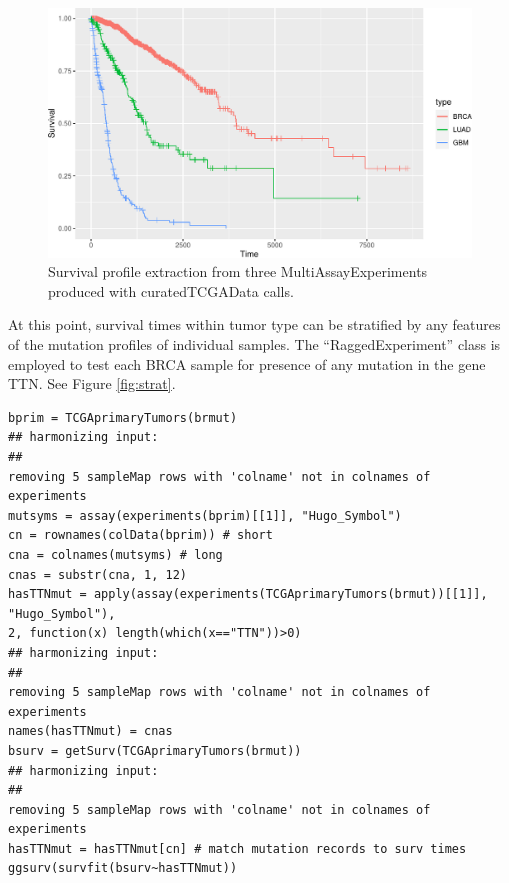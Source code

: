 \begin{figure}
\includegraphics[width=0.8\linewidth,]{bioccb_files/figure-latex/dothesurv-1} \caption{Survival profile extraction from three MultiAssayExperiments produced with curatedTCGAData calls.}\label{fig:dothesurv}
\end{figure}

At this point, survival times within tumor type can be stratified by any
features of the mutation profiles of individual samples.
The ``RaggedExperiment'' class is employed to test each BRCA sample for
presence of any mutation in the gene TTN. See Figure \ref{fig:strat}.

\begin{shaded}
\begin{verbatim}
bprim = TCGAprimaryTumors(brmut)
## harmonizing input:
##
removing 5 sampleMap rows with 'colname' not in colnames of experiments
mutsyms = assay(experiments(bprim)[[1]], "Hugo_Symbol")
cn = rownames(colData(bprim)) # short
cna = colnames(mutsyms) # long
cnas = substr(cna, 1, 12)
hasTTNmut = apply(assay(experiments(TCGAprimaryTumors(brmut))[[1]], "Hugo_Symbol"),
2, function(x) length(which(x=="TTN"))>0)
## harmonizing input:
##
removing 5 sampleMap rows with 'colname' not in colnames of experiments
names(hasTTNmut) = cnas
bsurv = getSurv(TCGAprimaryTumors(brmut))
## harmonizing input:
##
removing 5 sampleMap rows with 'colname' not in colnames of experiments
hasTTNmut = hasTTNmut[cn] # match mutation records to surv times
ggsurv(survfit(bsurv~hasTTNmut))
\end{verbatim}
\end{shaded}


